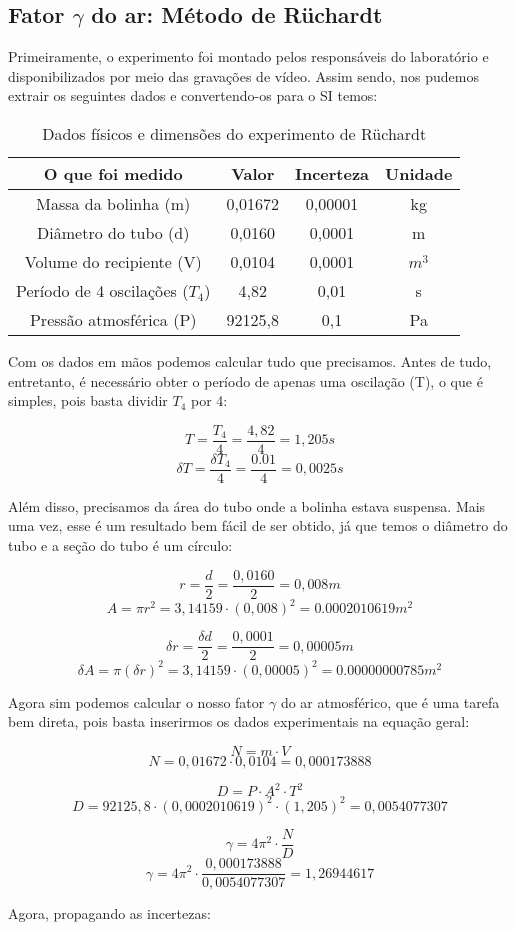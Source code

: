 \subsection{Fator $\gamma$ do ar: Método de Rüchardt}

Primeiramente, o experimento foi montado pelos responsáveis do laboratório e disponibilizados por meio das gravações de vídeo. Assim sendo, nos pudemos extrair os seguintes dados e convertendo-os para o SI temos:

\begin{table}[H]
    \centering
    \begin{tabular}{ |c||c||c||c|  }
        \hline
        \textbf{O que foi medido} & \textbf{Valor} & \textbf{Incerteza} & \textbf{Unidade}\\
        \hline 
         Massa da bolinha (m)       & 0,01672   & 0,00001   & kg\\
         Diâmetro do tubo (d)       & 0,0160    & 0,0001    & m\\
         Volume do recipiente (V)   & 0,0104    & 0,0001    & $m^3$\\
         \hline
         Período de 4 oscilações ($T_4$) & 4,82 & 0,01 & s\\
         \hline
         Pressão atmosférica (P) & 92125,8 & 0,1 & Pa\\
        \hline
    \end{tabular}
    \caption{Dados físicos e dimensões do experimento de Rüchardt} 
\end{table}

Com os dados em mãos podemos calcular tudo que precisamos. Antes de tudo, entretanto, é necessário obter o período de apenas uma oscilação (T), o que é simples, pois basta dividir $T_4$ por 4:

\[ T = \frac{T_4}{4} = \frac{4,82}{4} = 1,205 s \]
\[ \delta T = \frac{\delta T_4}{4} = \frac{0.01}{4} = 0,0025 s \]

Além disso, precisamos da área do tubo onde a bolinha estava suspensa. Mais uma vez, esse é um resultado bem fácil de ser obtido, já que temos o diâmetro do tubo e a seção do tubo é um círculo:

\[ r = \frac{d}{2} = \frac{0,0160}{2} = 0,008 m \]
\[ A = \pi r^2 = 3,14159 \cdot (0,008)^2 = 0.0002010619 m^2 \]

\[ \delta r = \frac{\delta d}{2} = \frac{0,0001}{2} = 0,00005 m \]
\[ \delta A = \pi (\delta r)^2 = 3,14159 \cdot (0,00005)^2 = 0.00000000785 m^2 \]

Agora sim podemos calcular o nosso fator $\gamma$ do ar atmosférico, que é uma tarefa bem direta, pois basta inserirmos os dados experimentais na equação geral:

\[ N = m \cdot V \]
\[ N = 0,01672 \cdot 0,0104 = 0,000173888 \]

\[ D = P \cdot A^2 \cdot T^2 \]
\[ D = 92125,8 \cdot (0,0002010619)^2 \cdot (1,205)^2 = 0,0054077307 \]

\[ \gamma = 4\pi^2 \cdot \frac{N}{D} \]
\[ \gamma = 4\pi^2 \cdot \frac{0,000173888}{0,0054077307} = 1,26944617 \]

Agora, propagando as incertezas:


